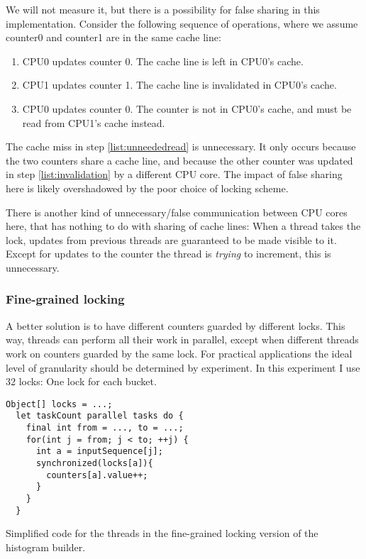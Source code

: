 We will not measure it, but there is a possibility for false sharing in this
implementation. Consider the following sequence of operations, where we assume
counter0 and counter1 are in the same cache line:

\begin{enumerate}
	\item CPU0 updates counter 0. The cache line is left in CPU0's cache.
	\item \label{list:invalidation} CPU1 updates counter 1. The cache line is invalidated in CPU0's
		cache.
	\item \label{list:unneededread} CPU0 updates counter 0. The counter is not in CPU0's cache, and
		must be read from CPU1's cache instead.
\end{enumerate}

The cache miss in step \ref{list:unneededread} is unnecessary. It only occurs
because the two counters share a cache line, and because the other counter was
updated in step \ref{list:invalidation} by a different CPU core. The impact of
false sharing here is likely overshadowed by the poor choice of locking scheme.

There is another kind of unnecessary/false communication between CPU cores here,
that has nothing to do with sharing of cache lines: When a thread takes the
lock, updates from previous threads are guaranteed to be made visible to it.
Except for updates to the counter the thread is \textit{trying} to increment,
this is unnecessary.

\subsubsection{Fine-grained locking}
\label{sec:fine-grained-histo}
A better solution is to have different counters guarded by different locks. This
way, threads can perform all their work in parallel, except when different
threads work on counters guarded by the same lock. For practical applications
the ideal level of granularity should be determined by experiment. In this
experiment I use 32 locks: One lock for each bucket.

\begin{code}
\begin{Verbatim}[frame=single]
  Object[] locks = ...;
  let taskCount parallel tasks do {
    final int from = ..., to = ...;
    for(int j = from; j < to; ++j) {
      int a = inputSequence[j];
      synchronized(locks[a]){
        counters[a].value++;
      }
    }
  }
\end{Verbatim}
	\caption{Simplified code for the threads in the fine-grained locking
	version of the histogram builder.}
\end{code}

